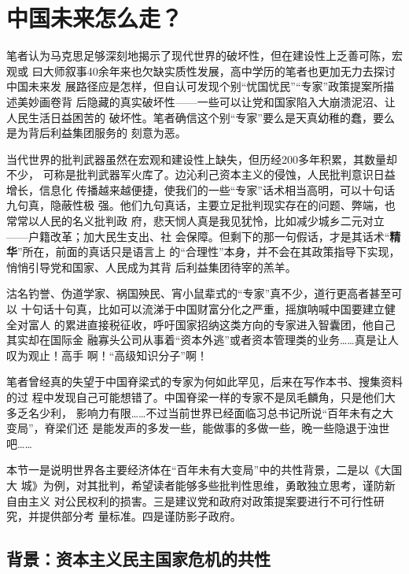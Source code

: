 \chapter{中国未来怎么走？}


笔者认为马克思足够深刻地揭示了现代世界的破坏性，但在建设性上乏善可陈，宏观或
曰大师叙事40余年来也欠缺实质性发展，高中学历的笔者也更加无力去探讨中国未来发
展路径应是怎样，但自认可发现个别“忧国忧民”“专家”政策提案所描述美妙画卷背
后隐藏的真实破坏性——一些可以让党和国家陷入大崩溃泥沼、让人民生活日益困苦的
破坏性。笔者确信这个别“专家”要么是天真幼稚的蠢，要么是为背后利益集团服务的
刻意为恶。

当代世界的批判武器虽然在宏观和建设性上缺失，但历经200多年积累，其数量却不少，
可称是批判武器军火库了。边沁利己资本主义的侵蚀，人民批判意识日益增长，信息化
传播越来越便捷，使我们的一些“专家”话术相当高明，可以十句话九句真，隐蔽性极
强。他们九句真话，主要立足批判现实存在的问题、弊端，也常常以人民的名义批判政
府，悲天悯人真是我见犹怜，比如减少城乡二元对立——户籍改革；加大民生支出、社
会保障。但剩下的那一句假话，才是其话术“\textbf{精华}”所在，前面的真话只是语言上
的“合理性”本身，并不会在其政策指导下实现，悄悄引导党和国家、人民成为其背
后利益集团待宰的羔羊。

沽名钓誉、伪道学家、祸国殃民、宵小鼠辈式的“专家”真不少，道行更高者甚至可以
十句话十句真，比如可以流涕于中国财富分化之严重，摇旗呐喊中国要建立健全对富人
的累进直接税征收，呼吁国家招纳这类方向的专家进入智囊团，他自己其实却在国际金
融寡头公司从事着“资本外逃”或者资本管理类的业务……真是让人叹为观止！高手
啊！“高级知识分子”啊！

笔者曾经真的失望于中国脊梁式的专家为何如此罕见，后来在写作本书、搜集资料的过
程中发现自己可能想错了。中国脊梁一样的专家不是凤毛麟角，只是他们大多乏名少利，
影响力有限……不过当前世界已经面临习总书记所说“百年未有之大变局”，脊梁们还
是能发声的多发一些，能做事的多做一些，晚一些隐退于浊世吧……

本节一是说明世界各主要经济体在“百年未有大变局”中的共性背景，二是以《大国大
城》为例，对其批判，希望读者能够多些批判性思维，勇敢独立思考，谨防新自由主义
对公民权利的损害。三是建议党和政府对政策提案要进行不可行性研究，并提供部分考
量标准。四是谨防影子政府。


\section{背景：资本主义民主国家危机的共性}


